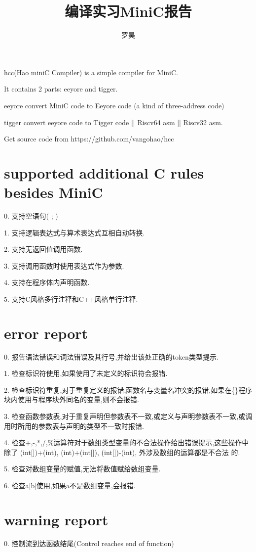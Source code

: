 \documentclass[UTF8]{article}
\begin{document}
\title{编译实习MiniC报告}
\author{罗昊}
\maketitle
hcc(Hao miniC Compiler) is a simple compiler for MiniC.

It contains 2 parts: eeyore and tigger. 

eeyore convert MiniC code to Eeyore code (a kind of three-address code)

tigger convert eeyore code to Tigger code || Riscv64 asm || Riscv32 asm.

Get source code from https://github.com/vangohao/hcc

\section{supported additional C rules besides MiniC}
0. 支持空语句( ; )

1. 支持逻辑表达式与算术表达式互相自动转换.

2. 支持无返回值调用函数.

3. 支持调用函数时使用表达式作为参数.

4. 支持在程序体内声明函数.

5. 支持C风格多行注释和C++风格单行注释.

\section{error report}
0. 报告语法错误和词法错误及其行号,并给出该处正确的token类型提示.

1. 检查标识符使用,如果使用了未定义的标识符会报错.

2. 检查标识符重复,对于重复定义的报错,函数名与变量名冲突的报错,如果在\{\}程序块内使用与程序块外同名的变量,则不会报错.

3. 检查函数参数表,对于重复声明但参数表不一致,或定义与声明参数表不一致,或调用时所用的参数表与声明的类型不一致时报错.

4. 检查+,-,*,/,\%运算符对于数组类型变量的不合法操作给出错误提示,这些操作中除了 (int[])+(int), (int)+(int[]), (int[])-(int), 外涉及数组的运算都是不合法 的.

5. 检查对数组变量的赋值,无法将数值赋给数组变量.

6. 检查a[b]使用,如果a不是数组变量,会报错.

\section{warning report}
0. 控制流到达函数结尾(Control reaches end of function)
\end{document}
